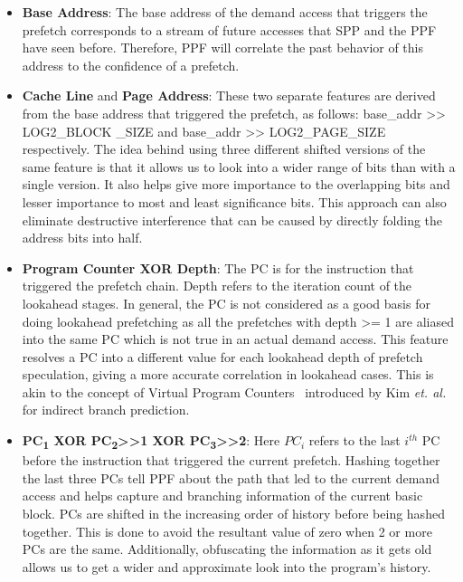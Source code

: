 \begin{itemize}
\item \textbf{Base Address}: The base address of the demand 
access that triggers the prefetch corresponds to a stream of 
future accesses that SPP and the PPF have seen before. 
Therefore, PPF will correlate the past behavior of this address 
to the confidence of a prefetch.

\item \textbf{Cache Line} and \textbf{Page Address}: These two
  separate features are derived from the base address that triggered
  the prefetch, as follows: base\_addr >> LOG2\_BLOCK \_SIZE and
  base\_addr >> LOG2\_PAGE\_SIZE respectively. The idea behind using
  three different shifted versions of the same feature is that it
  allows us to look into a wider range of bits than with a single
  version.  It also helps give more importance to the overlapping bits
  and lesser importance to most and least significance bits. This
  approach can also eliminate destructive interference that can be
  caused by directly folding the address bits into half.


\item \textbf{Program Counter XOR Depth}: The PC is for the
  instruction that triggered the prefetch chain.  Depth refers to the
  iteration count of the lookahead stages.  In general, the PC is not
  considered as a good basis for doing lookahead prefetching as all
  the prefetches with depth >= 1 are aliased into the same PC which
  is not true in an actual demand access.  This feature resolves
  a PC into a different value for each lookahead depth of prefetch
  speculation, giving a more accurate correlation in lookahead cases.
  This is akin to the concept of Virtual Program Counters~\cite{VPC}
  introduced by Kim \textit{et. al.} for indirect branch prediction.

\item \textbf{PC\textsubscript{1} XOR PC\textsubscript{2}>>1 XOR
    PC\textsubscript{3}>>2}: Here $PC_i$ refers to the last $i^{th}$
  PC before the instruction that triggered the current prefetch.
  Hashing together the last three PCs tell PPF about the path that led
  to the current demand access and helps capture and branching
  information of the current basic block.  PCs are shifted in the
  increasing order of history before being hashed together.  This is
  done to avoid the resultant value of zero when 2 or more PCs are the
  same.  Additionally, obfuscating the information as it gets old
  allows us to get a wider and approximate look into the program's
  history.


\end{itemize}
